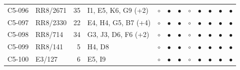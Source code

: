 {\begin{longtable}{llrp{3.9cm}cccccccc}
    C5-096 & RR8/2671 & 35 & I1, E5, K6, G9 (+2) & $\circ$ & $\bullet$ & $\bullet$ & $\circ$ & $\bullet$ & $\bullet$ & $\bullet$ & $\bullet$ \\
    C5-097 & RR8/2330 & 22 & E4, H4, G5, B7 (+4) & $\circ$ & $\bullet$ & $\bullet$ & $\circ$ & $\bullet$ & $\bullet$ & $\bullet$ & $\bullet$ \\
    C5-098 & RR8/714 & 34 & G3, J3, D6, F6 (+2) & $\circ$ & $\bullet$ & $\bullet$ & $\circ$ & $\bullet$ & $\bullet$ & $\bullet$ & $\bullet$ \\
    C5-099 & RR8/141 & 5 & H4, D8 & $\circ$ & $\bullet$ & $\bullet$ & $\circ$ & $\bullet$ & $\bullet$ & $\bullet$ & $\bullet$ \\
    C5-100 & E3/127 & 6 & E5, I9 & $\circ$ & $\bullet$ & $\bullet$ & $\circ$ & $\bullet$ & $\bullet$ & $\bullet$ & $\bullet$ \\
\end{longtable}
}
